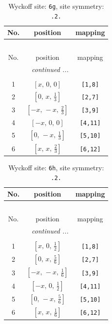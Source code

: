 \documentclass[fleqn,8pt]{jsarticle}
\begin{document}
\renewcommand{\arraystretch}{1.2}
\begin{longtable}{ccc}
\caption{Wyckoff site: {\tt 6g}, site symmetry: {\tt .2.}}
 \\
 \hline \hline
No. & position & mapping \\ \hline \endfirsthead

\multicolumn{2}{l}{\tablename\ \thetable{}} \\
 \hline \hline
No. & position & mapping \\ \hline \endhead

 \hline \hline
\multicolumn{2}{r}{\footnotesize\it continued ...} \\ \endfoot

 \hline \hline
\multicolumn{2}{r}{} \\ \endlastfoot

1 & $\left[ x,\, 0,\, 0 \right]$ & {\tt [1,8]} \\ \hline
2 & $\left[ 0,\, x,\, \frac{1}{3} \right]$ & {\tt [2,7]} \\ \hline
3 & $\left[ - x,\, - x,\, \frac{2}{3} \right]$ & {\tt [3,9]} \\ \hline
4 & $\left[ - x,\, 0,\, 0 \right]$ & {\tt [4,11]} \\ \hline
5 & $\left[ 0,\, - x,\, \frac{1}{3} \right]$ & {\tt [5,10]} \\ \hline
6 & $\left[ x,\, x,\, \frac{2}{3} \right]$ & {\tt [6,12]} \\
\end{longtable}
\renewcommand{\arraystretch}{1.2}
\begin{longtable}{ccc}
\caption{Wyckoff site: {\tt 6h}, site symmetry: {\tt .2.}}
 \\
 \hline \hline
No. & position & mapping \\ \hline \endfirsthead

\multicolumn{2}{l}{\tablename\ \thetable{}} \\
 \hline \hline
No. & position & mapping \\ \hline \endhead

 \hline \hline
\multicolumn{2}{r}{\footnotesize\it continued ...} \\ \endfoot

 \hline \hline
\multicolumn{2}{r}{} \\ \endlastfoot

1 & $\left[ x,\, 0,\, \frac{1}{2} \right]$ & {\tt [1,8]} \\ \hline
2 & $\left[ 0,\, x,\, \frac{5}{6} \right]$ & {\tt [2,7]} \\ \hline
3 & $\left[ - x,\, - x,\, \frac{1}{6} \right]$ & {\tt [3,9]} \\ \hline
4 & $\left[ - x,\, 0,\, \frac{1}{2} \right]$ & {\tt [4,11]} \\ \hline
5 & $\left[ 0,\, - x,\, \frac{5}{6} \right]$ & {\tt [5,10]} \\ \hline
6 & $\left[ x,\, x,\, \frac{1}{6} \right]$ & {\tt [6,12]} \\
\end{longtable}
\end{document}
